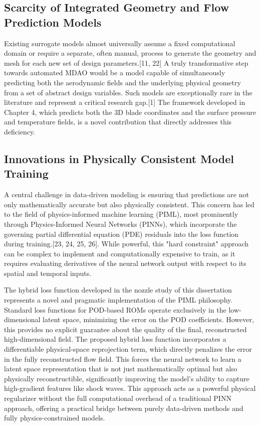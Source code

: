 \documentclass[dsc, EN]{ufabcFHZh}
\begin{document}
{\subsection{Scarcity of Integrated Geometry and Flow Prediction Models}

Existing surrogate models almost universally assume a fixed computational domain or require a separate, often manual, process to generate the geometry and mesh for each new set of design parameters.[11, 22] A truly transformative step towards automated MDAO would be a model capable of simultaneously predicting both the aerodynamic fields and the underlying physical geometry from a set of abstract design variables. Such models are exceptionally rare in the literature and represent a critical research gap.[1] The framework developed in Chapter 4, which predicts both the 3D blade coordinates and the surface pressure and temperature fields, is a novel contribution that directly addresses this deficiency.



\subsection{Innovations in Physically Consistent Model Training}
A central challenge in data-driven modeling is ensuring that predictions are not only mathematically accurate but also physically consistent. This concern has led to the field of physics-informed machine learning (PIML), most prominently through Physics-Informed Neural Networks (PINNs), which incorporate the governing partial differential equation (PDE) residuals into the loss function during training.[23, 24, 25, 26]. While powerful, this "hard constraint" approach can be complex to implement and computationally expensive to train, as it requires evaluating derivatives of the neural network output with respect to its spatial and temporal inputs.

The hybrid loss function developed in the nozzle study of this dissertation represents a novel and pragmatic implementation of the PIML philosophy. Standard loss functions for POD-based ROMs operate exclusively in the low-dimensional latent space, minimizing the error on the POD coefficients. However, this provides no explicit guarantee about the quality of the final, reconstructed high-dimensional field. The proposed hybrid loss function incorporates a differentiable physical-space reprojection term, which directly penalizes the error in the fully reconstructed flow field. This forces the neural network to learn a latent space representation that is not just mathematically optimal but also physically reconstructible, significantly improving the model's ability to capture high-gradient features like shock waves. This approach acts as a powerful physical regularizer without the full computational overhead of a traditional PINN approach, offering a practical bridge between purely data-driven methods and fully physics-constrained models.

}
\end{document}
